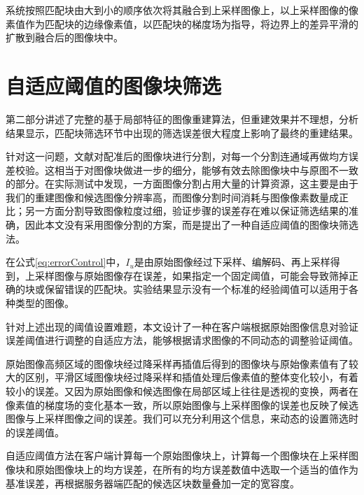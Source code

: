 \documentclass[UTF8]{csoarticle}
\begin{document}
系统按照匹配块由大到小的顺序依次将其融合到上采样图像上，以上采样图像的像素值作为匹配块的边缘像素值，以匹配块的梯度场为指导，将边界上的差异平滑的扩散到融合后的图像块中。

\section{自适应阈值的图像块筛选}

第二部分讲述了完整的基于局部特征的图像重建算法，但重建效果并不理想，分析结果显示，匹配块筛选环节中出现的筛选误差很大程度上影响了最终的重建结果。

针对这一问题，文献\cite{Dai:2012vn}对配准后的图像块进行分割，对每一个分割连通域再做均方误差校验。这相当于对图像块做进一步的细分，能够有效去除图像块中与原图不一致的部分。在实际测试中发现，一方面图像分割占用大量的计算资源，这主要是由于我们的重建图像和候选图像分辨率高，而图像分割时间消耗与图像像素数量成正比；另一方面分割导致图像粒度过细，验证步骤的误差存在难以保证筛选结果的准确，因此本文没有采用图像分割的方案，而是提出了一种自适应阈值的图像块筛选法。

在公式\ref{eq:errorControl}中，\(I_u\)是由原始图像经过下采样、编解码、再上采样得到，上采样图像与原始图像存在误差，如果指定一个固定阈值，可能会导致筛掉正确的块或保留错误的匹配块。实验结果显示没有一个标准的经验阈值可以适用于各种类型的图像。

针对上述出现的阈值设置难题，本文设计了一种在客户端根据原始图像信息对验证误差阈值进行调整的自适应方法，能够根据请求图像的不同动态的调整验证阈值。

原始图像高频区域的图像块经过降采样再插值后得到的图像块与原始像素值有了较大的区别，平滑区域图像块经过降采样和插值处理后像素值的整体变化较小，有着较小的误差。又因为原始图像和候选图像在局部区域上往往是透视的变换，两者在像素值的梯度场的变化基本一致，所以原始图像与上采样图像的误差也反映了候选图像与上采样图像之间的误差。我们可以充分利用这个信息，来动态的设置筛选时的误差阈值。

自适应阈值方法在客户端计算每一个原始图像块上，计算每一个图像块在上采样图像块和原始图像块上的均方误差，在所有的均方误差数值中选取一个适当的值作为基准误差，再根据服务器端匹配的候选区块数量叠加一定的宽容度。
\end{document}

